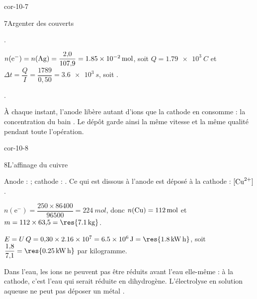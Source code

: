 \begin{blocLivre}{cor-10-7}
\begin{corrige}{7}{Argenter des couverts}
\begin{questions}
\item {}.
\item $n(\mathrm{e}^-)=n(\ce{Ag})=\dfrac{2{,}0}{107{,}9}=\qty{1,85e-2}{mol}$, soit $Q=\qty{1,79e3}{C}$ et
$\Delta t=\dfrac{Q}{I}=\dfrac{1789}{0{,}50}=\qty{3,6e3}{s}$, soit .
\item {}.
\item À chaque instant, l'anode libère autant d'ions  que la cathode en consomme : la concentration du bain
. Le dépôt garde ainsi la même vitesse et la même qualité pendant toute l'opération.
\end{questions}
\end{corrige}
\end{blocLivre}
\begin{blocLivre}{cor-10-8}
\begin{corrige}{8}{L'affinage du cuivre}
\begin{questions}
\item Anode :  ; cathode : . Ce qui est dissous à l'anode est déposé à
la cathode : $[\ce{Cu^2+}]$ .
\item $n(\mathrm{e}^-)=\dfrac{250\times86400}{\num{96500}}=\qty{224}{mol}$, donc $n(\ce{Cu})=\qty{112}{mol}$ et
$m=112\times63{,}5=\res{\qty{7,1}{kg}}$.
\item $E=U\,Q=0{,}30\times\num{2.16e7}=\qty{6,5e6}{J}=\res{\qty{1,8}{kW.h}}$, soit
$\dfrac{1{,}8}{7{,}1}=\res{\qty{0,25}{kW.h}}$ par kilogramme.
\item Dans l'eau, les ions  ne peuvent pas être réduits avant l'eau elle-même : à la cathode, c'est l'eau qui
serait réduite en dihydrogène. L'électrolyse en solution aqueuse ne peut pas déposer un métal .
\end{questions}
\end{corrige}
\end{blocLivre}

